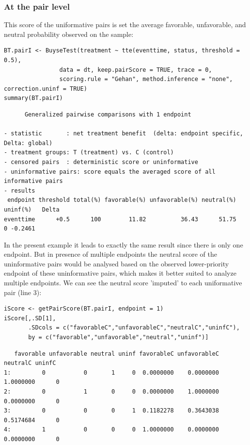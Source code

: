 \documentclass[12pt]{article}
\begin{document}
\subsubsection{At the pair level}
\label{sec:org6cdf883}

This score of the uniformative pairs is set the average favorable,
unfavorable, and neutral probability observed on the sample:
\lstset{language=r,label= ,caption= ,captionpos=b,numbers=none}
\begin{lstlisting}
BT.pairI <- BuyseTest(treatment ~ tte(eventtime, status, threshold = 0.5),
                data = dt, keep.pairScore = TRUE, trace = 0,
                scoring.rule = "Gehan", method.inference = "none", correction.uninf = TRUE)
summary(BT.pairI)
\end{lstlisting}

\begin{verbatim}
      Generalized pairwise comparisons with 1 endpoint

- statistic       : net treatment benefit  (delta: endpoint specific, Delta: global) 
- treatment groups: T (treatment) vs. C (control) 
- censored pairs  : deterministic score or uninformative
- uninformative pairs: score equals the averaged score of all informative pairs
- results
 endpoint threshold total(%) favorable(%) unfavorable(%) neutral(%) uninf(%)   Delta
eventtime      +0.5      100        11.82          36.43      51.75        0 -0.2461
\end{verbatim}


In the present example it leads to exactly the same result since there
is only one endpoint. But in presence of multiple endpoints the
neutral score of the uninformative pairs would be analysed based on
the observed lower-priority endpoint of these uninformative pairs,
which makes it better suited to analyze multiple endpoints. We can see
the neutral score 'imputed' to each uniformative pair (line 3):
\lstset{language=r,label= ,caption= ,captionpos=b,numbers=none}
\begin{lstlisting}
iScore <- getPairScore(BT.pairI, endpoint = 1)
iScore[,.SD[1], 
       .SDcols = c("favorableC","unfavorableC","neutralC","uninfC"),
       by = c("favorable","unfavorable","neutral","uninf")]
\end{lstlisting}

\begin{verbatim}
   favorable unfavorable neutral uninf favorableC unfavorableC  neutralC uninfC
1:         0           0       1     0  0.0000000    0.0000000 1.0000000      0
2:         0           1       0     0  0.0000000    1.0000000 0.0000000      0
3:         0           0       0     1  0.1182278    0.3643038 0.5174684      0
4:         1           0       0     0  1.0000000    0.0000000 0.0000000      0
\end{verbatim}
\end{document}
